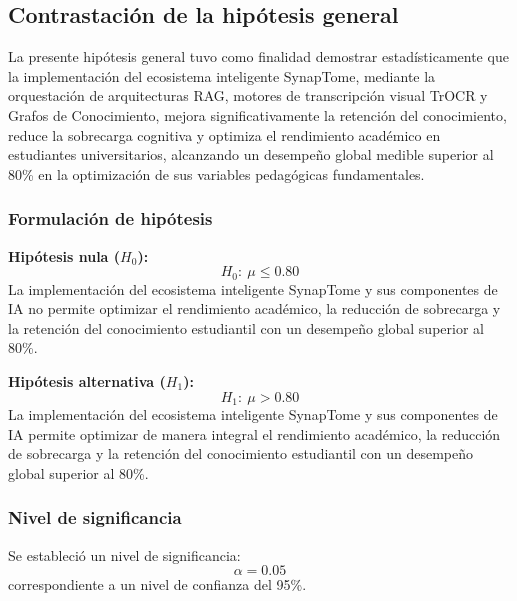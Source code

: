 \vspace{0.4cm}

\subsection{Contrastación de la hipótesis general}

La presente hipótesis general tuvo como finalidad demostrar estadísticamente que la implementación del ecosistema inteligente SynapTome, mediante la orquestación de arquitecturas RAG, motores de transcripción visual TrOCR y Grafos de Conocimiento, mejora significativamente la retención del conocimiento, reduce la sobrecarga cognitiva y optimiza el rendimiento académico en estudiantes universitarios, alcanzando un desempeño global medible superior al 80\% en la optimización de sus variables pedagógicas fundamentales.

\vspace{0.4cm}

\subsubsection{Formulación de hipótesis}
\textbf{Hipótesis nula (\(H_0\)):}
\[
H_0:\ \mu \leq 0.80
\]
La implementación del ecosistema inteligente SynapTome y sus componentes de IA no permite optimizar el rendimiento académico, la reducción de sobrecarga y la retención del conocimiento estudiantil con un desempeño global superior al 80\%.

\vspace{0.3cm}

\textbf{Hipótesis alternativa (\(H_1\)):}
\[
H_1:\ \mu > 0.80
\]
La implementación del ecosistema inteligente SynapTome y sus componentes de IA permite optimizar de manera integral el rendimiento académico, la reducción de sobrecarga y la retención del conocimiento estudiantil con un desempeño global superior al 80\%.

\vspace{0.4cm}

\subsubsection{Nivel de significancia}
Se estableció un nivel de significancia:
\[
\alpha = 0.05
\]
correspondiente a un nivel de confianza del 95\%.

\vspace{0.4cm}

